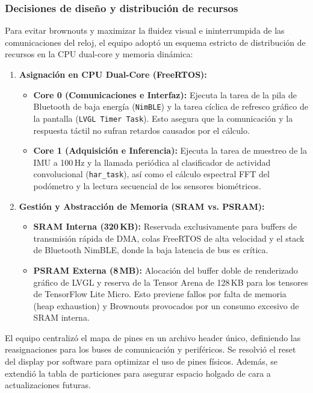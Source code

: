 \documentclass[letterpaper,11pt]{article}
\begin{document}
\subsubsection{Decisiones de diseño y distribución de recursos}

Para evitar brownouts y maximizar la fluidez visual e ininterrumpida de las comunicaciones del reloj, el equipo adoptó un esquema estricto de distribución de recursos en la CPU dual-core y memoria dinámica:
\begin{enumerate}
    \item \textbf{Asignación en CPU Dual-Core (FreeRTOS):}
    \begin{itemize}
        \item \textbf{Core 0 (Comunicaciones e Interfaz):} Ejecuta la tarea de la pila de Bluetooth de baja energía (\texttt{NimBLE}) y la tarea cíclica de refresco gráfico de la pantalla (\texttt{LVGL Timer Task}). Esto asegura que la comunicación y la respuesta táctil no sufran retardos causados por el cálculo.
        \item \textbf{Core 1 (Adquisición e Inferencia):} Ejecuta la tarea de muestreo de la IMU a 100\,Hz y la llamada periódica al clasificador de actividad convolucional (\texttt{har\_task}), así como el cálculo espectral FFT del podómetro y la lectura secuencial de los sensores biométricos.
    \end{itemize}
    \item \textbf{Gestión y Abstracción de Memoria (SRAM vs. PSRAM):}
    \begin{itemize}
        \item \textbf{SRAM Interna (320\,KB):} Reservada exclusivamente para buffers de transmisión rápida de DMA, colas FreeRTOS de alta velocidad y el stack de Bluetooth NimBLE, donde la baja latencia de bus es crítica.
        \item \textbf{PSRAM Externa (8\,MB):} Alocación del buffer doble de renderizado gráfico de LVGL y reserva de la Tensor Arena de 128\,KB para los tensores de TensorFlow Lite Micro. Esto previene fallos por falta de memoria (heap exhaustion) y Brownouts provocados por un consumo excesivo de SRAM interna.
    \end{itemize}
\end{enumerate}

El equipo centralizó el mapa de pines en un archivo header único, definiendo las reasignaciones para los buses de comunicación y periféricos. Se resolvió el reset del display por software para optimizar el uso de pines físicos. Además, se extendió la tabla de particiones para asegurar espacio holgado de cara a actualizaciones futuras.
\end{document}
